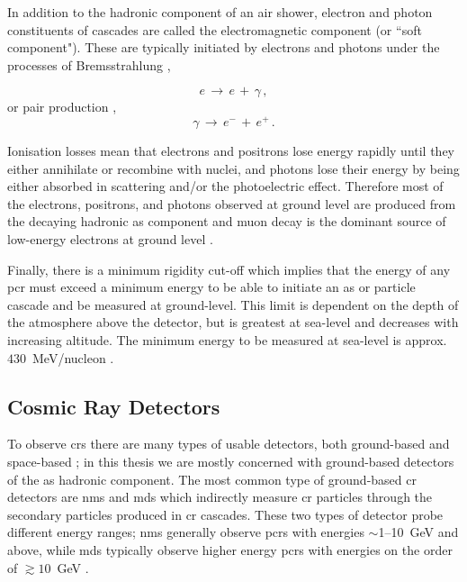 
In addition to the hadronic component of an air shower, electron and photon constituents of cascades are called the electromagnetic component (or ``soft component"). These are typically initiated by electrons and photons under the processes of Bremsstrahlung \citep{grupen_astroparticle_2005},

\begin{equation}
\label{eq:bremss}
e \, \rightarrow \, e \, + \, \gamma \, ,
\end{equation}
%
or pair production \citep{grupen_astroparticle_2005},
%
\begin{equation}
\label{eq:pair_prod}
\gamma \, \rightarrow \, e^- \, + \, e^+ \, .
\end{equation}

Ionisation losses mean that electrons and positrons lose energy rapidly until they either annihilate or recombine with nuclei, and photons lose their energy by being either absorbed in scattering and/or the photoelectric effect. Therefore most of the electrons, positrons,
and photons observed at ground level are produced from the decaying hadronic \gls{as} component and muon decay is the dominant source of low-energy electrons at ground level \citep{particle_data_group_review_2020}.

Finally, there is a minimum rigidity cut-off which implies that the energy of any \gls{pcr} must exceed a minimum energy to be able to initiate an \gls{as} or particle cascade and be measured at ground-level. This limit is dependent on the depth of the atmosphere above the detector, but is greatest at sea-level and decreases with increasing altitude. The minimum energy to be measured at sea-level is approx. $430$~MeV/nucleon \citep{dorman_theory_2004, dorman_experimental_2004, poluianov_gle_2017}.



\subsection{Cosmic Ray Detectors}

To observe \glspl{cr} there are many types of usable detectors, both ground-based and space-based \citep{schrijver_heliophysics_2010}; in this thesis we are mostly concerned with ground-based detectors of the \gls{as} hadronic component. The most common type of ground-based \gls{cr} detectors are \glspl{nm} and \glspl{md} which indirectly measure \gls{cr} particles through the secondary particles produced in \gls{cr} cascades. These two types of detector probe different energy ranges; \glspl{nm} generally observe \glspl{pcr} with energies $\sim$1--10~GeV and above, while \glspl{md} typically observe higher energy \glspl{pcr} with energies on the order of $\gtrsim10$~GeV \citep{kuwabara_real-time_2006, rockenbach_global_2014}.

